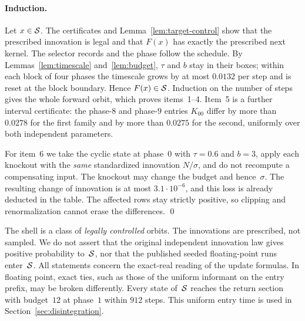 \paragraph{Induction.}
Let $x\in\mathcal{S}$. The certificates and Lemma~\ref{lem:target-control} show that the prescribed innovation is legal and that $F(x)$ has exactly the prescribed next kernel. The selector records and the phase follow the schedule. By Lemmas~\ref{lem:timescale} and~\ref{lem:budget}, $\tau$ and $b$ stay in their boxes; within each block of four phases the timescale grows by at most $0.0132$ per step and is reset at the block boundary. Hence $F(x)\in\mathcal{S}$. Induction on the number of steps gives the whole forward orbit, which proves items~1--4. Item~5 is a further interval certificate: the phase-$8$ and phase-$9$ entries $K_{00}$ differ by more than $0.0278$ for the first family and by more than $0.0275$ for the second, uniformly over both independent parameters.

For item~6 we take the cyclic state at phase~$0$ with $\tau=0.6$ and $b=3$, apply each knockout with the \emph{same} standardized innovation $N/\sigma$, and do not recompute a compensating input. The knockout may change the budget and hence~$\sigma$. The resulting change of innovation is at most $3.1\cdot10^{-6}$, and this loss is already deducted in the table. The affected rows stay strictly positive, so clipping and renormalization cannot erase the differences. \qed



\begin{remark}
The shell is a class of \emph{legally controlled} orbits. The innovations are prescribed, not sampled. We do not assert that the original independent innovation law gives positive probability to~$\mathcal{S}$, nor that the published seeded floating-point runs enter~$\mathcal{S}$. All statements concern the exact-real reading of the update formulas. In floating point, exact ties, such as those of the uniform informant on the entry prefix, may be broken differently. Every state of~$\mathcal{S}$ reaches the return section with budget~$12$ at phase~$1$ within $912$ steps. This uniform entry time is used in Section~\ref{sec:disintegration}.
\end{remark}
